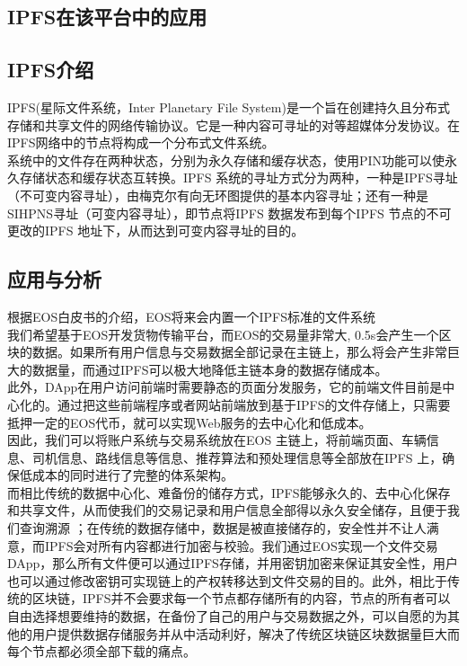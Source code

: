 \documentclass[UTF8]{ctexart}
\begin{document}
\begin{multicols}{2}
\section{IPFS在该平台中的应用}
\subsection{IPFS介绍}
IPFS(星际文件系统，Inter Planetary File System)是一个旨在创建持久且分布式存储和共享文件的网络传输协议。它是一种内容可寻址的对等超媒体分发协议。在IPFS网络中的节点将构成一个分布式文件系统。\\
 系统中的文件存在两种状态，分别为永久存储和缓存状态，使用PIN功能可以使永久存储状态和缓存状态互转换。IPFS 系统的寻址方式分为两种，一种是IPFS寻址（不可变内容寻址），由梅克尔有向无环图提供的基本内容寻址；还有一种是SIHPNS寻址（可变内容寻址），即节点将IPFS 数据发布到每个IPFS 节点的不可更改的IPFS 地址下，从而达到可变内容寻址的目的。
\subsection{应用与分析}
根据EOS白皮书的介绍，EOS将来会内置一个IPFS标准的文件系统\cite{ref5}\\
\indent 我们希望基于EOS开发货物传输平台，而EOS的交易量非常大, 0.5s会产生一个区块的数据。如果所有用户信息与交易数据全部记录在主链上，那么将会产生非常巨大的数据量，而通过IPFS可以极大地降低主链本身的数据存储成本。\\
\indent 此外，DApp在用户访问前端时需要静态的页面分发服务，它的前端文件目前是中心化的。通过把这些前端程序或者网站前端放到基于IPFS的文件存储上，只需要抵押一定的EOS代币，就可以实现Web服务的去中心化和低成本。\\
因此，我们可以将账户系统与交易系统放在EOS 主链上，将前端页面、车辆信息、司机信息、路线信息等信息、推荐算法和预处理信息等全部放在IPFS 上，确保低成本的同时进行了完整的体系架构。\\
\indent 而相比传统的数据中心化、难备份的储存方式，IPFS能够永久的、去中心化保存和共享文件，从而使我们的交易记录和用户信息全部得以永久安全储存，且便于我们查询溯源 ；在传统的数据存储中，数据是被直接储存的，安全性并不让人满意，而IPFS会对所有内容都进行加密与校验。我们通过EOS实现一个文件交易DApp，那么所有文件便可以通过IPFS存储，并用密钥加密来保证其安全性，用户也可以通过修改密钥可实现链上的产权转移达到文件交易的目的。此外，相比于传统的区块链，IPFS并不会要求每一个节点都存储所有的内容，节点的所有者可以自由选择想要维持的数据，在备份了自己的用户与交易数据之外，可以自愿的为其他的用户提供数据存储服务并从中活动利好，解决了传统区块链区块数据量巨大而每个节点都必须全部下载的痛点。

\end{multicols}
\end{document}
